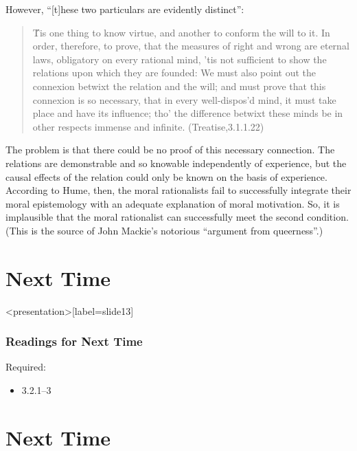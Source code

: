 However, ``[t]hese two particulars are evidently distinct'':

\begin{quote}
	\'Tis one thing to know virtue, and another to conform the will to it. In order, therefore, to prove, that the measures of right and wrong are eternal laws, obligatory on every rational mind, 'tis not sufficient to show the relations upon which they are founded: We must also point out the connexion betwixt the relation and the will; and must prove that this connexion is so necessary, that in every well-dispos'd mind, it must take place and have its influence; tho' the difference betwixt these minds be in other respects immense and infinite. (Treatise,3.1.1.22)
\end{quote}

The problem is that there could be no proof of this necessary connection. The relations are demonstrable and so knowable independently of experience, but the causal effects of the relation could only be known on the basis of experience. According to Hume, then, the moral rationalists fail to successfully integrate their moral epistemology with an adequate explanation of moral motivation. So, it is implausible that the moral rationalist can successfully meet the second condition. (This is the source of John Mackie's notorious ``argument from queerness''.) \change


\section{Next Time}\label{sec:readings_for_next_time} %

% 

\begin{frame}<presentation>[label=slide13]
    \frametitle{Readings for Next Time}
        Required:
        \begin{itemize}
            \item 3.2.1--3
        \end{itemize}
\end{frame}





\section{Next Time}\label{sec:next_time} %





